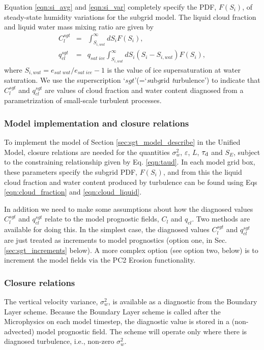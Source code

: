\documentclass{UMDP_article}
\begin{document}
Equation \ref{eqn:si_avg} and \ref{eqn:si_var} completely specify the PDF, $F(S_i)$, of
steady-state humidity variations for the subgrid model. The liquid cloud fraction and
liquid water mass mixing ratio are given by
\begin{eqnarray}
 C_l^{sgt} &=& \int_{S_{i,wat}}^\infty d S_i F(S_i), \label{eqn:cloud_fraction} \\
 q_{cl}^{sgt} &=&  q_{sat\;ice}\int_{S_{i,wat}}^\infty d S_i (S_i -S_{i,wat}) F(S_i) \label{eqn:cloud_liquid},
\end{eqnarray}
where $S_{i,wat} = e_{sat\;wat}/e_{sat\;ice}-1$ is the value of ice
supersaturation at water saturation.
We use the superscription `$sgt$'(=`{\it s}ub{\it g}rid {\it t}urbulence') to indicate
that $C_l^{sgt}$ and $q_{cl}^{sgt}$ are values of cloud fraction and water content
diagnosed from a parametrization of small-scale turbulent processes.


\subsubsection{Model implementation and closure relations}
\label{sec:sgt_model_implement}

To implement the model of Section \ref{sec:sgt_model_describe} in the
Unified Model, closure relations are needed for the quantities $\sigma_w^2$,
$\varepsilon$, $L$, $\tau_{\rm d}$ and $S_E$, subject to the constraining relationship
given by Eq. \ref{eqn:taud}.
In each model grid box, these parameters specify the subgrid PDF, $F(S_i)$, and
from this the liquid cloud fraction and water content produced by turbulence
can be found using Eqs \ref{eqn:cloud_fraction} and \ref{eqn:cloud_liquid}.

In addition we need to make some assumptions about how the diagnosed values
$C_l^{sgt}$ and $q_{cl}^{sgt}$ relate to the model prognostic fields, $C_l$ and $q_{cl}$.
Two methods are available for doing this. In the simplest case, the diagnosed
values $C_l^{sgt}$ and $q_{cl}^{sgt}$ are just treated as increments to model prognostics
(option one, in Sec. \ref{sec:sgt_increments} below).
A more complex option (see option two, below) is to increment the
model fields via the PC2 Erosion functionality.

\subsubsection{Closure relations}\label{sec:sgt_closures}

The vertical velocity variance, $\sigma_w^2$, is available as a diagnostic from the
Boundary Layer scheme. Because the Boundary Layer scheme is called after the
Microphysics on each model timestep, the diagnostic value is stored in a (non-advected)
model prognostic field. The scheme will operate only where there is diagnosed turbulence,
i.e., non-zero $\sigma_w^2$.
\end{document}
